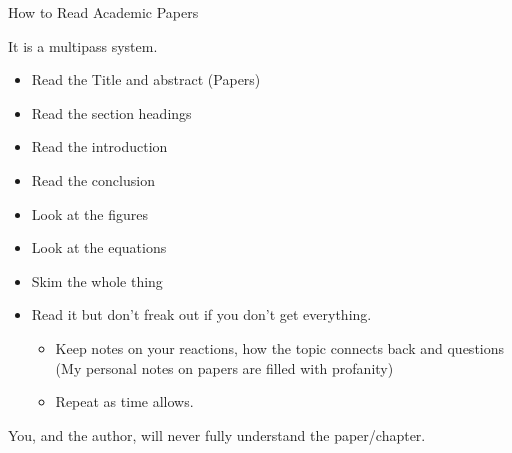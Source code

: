 \documentclass[
  ignorenonframetext,
]{beamer}
\providecommand{\tightlist}{%
  \setlength{\itemsep}{0pt}\setlength{\parskip}{0pt}}
\begin{document}
\begin{frame}{How to Read Academic Papers}
\protect\hypertarget{how-to-read-academic-papers}{}

It is a multipass system.

\begin{itemize}
\tightlist
\item
  Read the Title and abstract (Papers)
\item
  Read the section headings
\item
  Read the introduction
\item
  Read the conclusion
\item
  Look at the figures
\item
  Look at the equations
\item
  Skim the whole thing
\item
  Read it but don't freak out if you don't get everything.

  \begin{itemize}
  \tightlist
  \item
    Keep notes on your reactions, how the topic connects back and
    questions (My personal notes on papers are filled with profanity)
  \item
    Repeat as time allows.
  \end{itemize}
\end{itemize}

You, and the author, will never fully understand the paper/chapter.

\end{frame}
\end{document}
